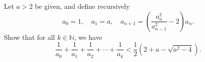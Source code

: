 Let $a > 2$ be given, and define recursively
\[
a_0 = 1, \quad a_1 = a, \quad a_{n+1} = \left( \frac{a_n^2}{a_{n-1}^2} - 2 \right) a_n.
\]
Show that for all $k \in \mathbb{N}$, we have
\[
\frac{1}{a_0} + \frac{1}{a_1} + \frac{1}{a_2} + \cdots + \frac{1}{a_k} < \frac{1}{2} \left( 2 + a - \sqrt{a^2 - 4} \right).
\]
